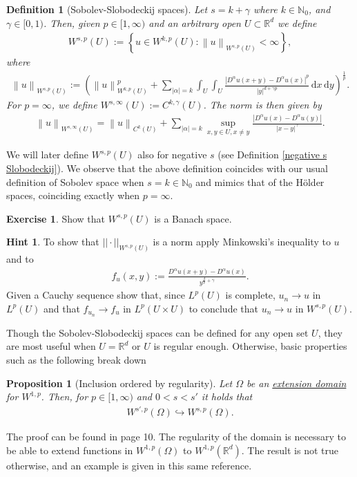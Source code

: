 \documentclass[
    a4paper,
    DIV=14,
    abstract=true,
    numbers=noenddot
]
{scrartcl}
\newtheorem{proposition}[theorem]{Proposition}
\newtheorem{definition}[theorem]{Definition}
\theoremstyle{definition}
\newtheorem{exercise}{Exercise}
\newtheorem*{hint}{Hint}
\newcommand{\set}[1]{\left\{#1\right\}}
\renewcommand{\norm}[1]{\left\lVert #1 \right\rVert}\renewcommand{\abs}[1]{\left| #1 \right|}
\renewcommand{\d}{\,\mathrm{d}}\newcommand{\dx}{\,\mathrm{d}x}
\newcommand{\N}{\mathbb{N}}
\newcommand{\R}{\mathbb{R}}
\begin{document}
\begin{definition}[Sobolev-Slobodeckij spaces]\label{soledkij def}
    Let $s=k+\gamma$ where $k \in \N_0$, and $\gamma \in [0,1)$. Then, given  $p \in [1,\infty)$ and an arbitrary open $U \subset \R^d$ we define
    \begin{align*}
        W^{s ,p}(U):= \set{u \in W^{k ,p}(U): \norm{u}_{W^{s,p}(U)}<\infty},
    \end{align*}
    where
    \begin{align}\label{norm def}
        \norm{u}_{W^{s,p}(U)}:= \left(\norm{u}_{W^{k,p}(U)}^p+ \sum_{\abs{\alpha}=k }\int_{U}\int_{U}\frac{\abs{D^\alpha u(x+y)-D^\alpha u(x)}^p}{\abs{y}^{d+\gamma p}}\d x \d y\right)^\frac{1}{p}.
    \end{align}
    For $p = \infty$, we define $W^{s,\infty}(U):= C^{k,\gamma}(U)$. The norm is then given by
    \begin{align*}
        \norm{u}_{W^{s,\infty}(U)}= \norm{u}_{C^{k}(U)}+ \sum_{\abs{\alpha} =k}  \sup _{x, y \in U, x \neq y} \frac{|D^\alpha u(x)- D^\alpha u(y)|}{|x-y|^\gamma }.
    \end{align*}
\end{definition}
We will later define $W^{s,p}(U)$ also for negative $s$ (see Definition \ref{negative s Slobodeckij}). We observe that the above definition coincides with our usual definition of Sobolev space when $s=k \in \N_0$ and mimics that of the H\"older spaces, coinciding exactly when $p=\infty$.
\begin{exercise}
    Show that $W^{s,p}(U)$ is a Banach space.
\end{exercise}
\begin{hint}
    To show that $|| \cdot ||_{W^{s,p}(U)}$ is a norm apply Minkowski's inequality to $u$ and to
    \begin{align*}
        f_u(x,y):=\frac{D^\alpha u(x+y)-D^\alpha u(x)}{y^{\frac{d}{p}+\gamma}}.
    \end{align*}
    Given a Cauchy sequence show that, since $L^p(U)$ is complete, $u_n \to u$ in $L^p(U)$ and that $f_{u_n} \to f_u$ in $L^p(U\times U)$ to conclude that $u_n \to u$ in $W^{s,p}(U)$.
\end{hint}
Though the Sobolev-Slobodeckij spaces can be defined for any open set $U$, they are most useful when $U=\R^d$ or $U$  is regular enough. Otherwise, basic properties such as the following break down
\begin{proposition}[Inclusion ordered by regularity]\label{inclusion ordered by regularity}
    Let  $\Omega$ be an \href{https://nowheredifferentiable.com/2023-07-12-PDEs-3-Sobolev_spaces/#:~:text=extend%20Sobolev%20functions}{extension domain} for $W^{1,p}$.  Then, for $p \in [1,\infty)$ and $0<s<s'$ it holds that
    \begin{align*}
        W^{s',p}(\Omega )\hookrightarrow W^{s,p}(\Omega ).
    \end{align*}
\end{proposition}
The proof can be found in \cite{di2012hitchhikers} page 10. The regularity of the domain is necessary to be able to extend functions in $W^{1,p}(\Omega )$ to $W^{1,p}(\R^d)$. The result is not true otherwise, and an example is given in this same reference.
\end{document}
